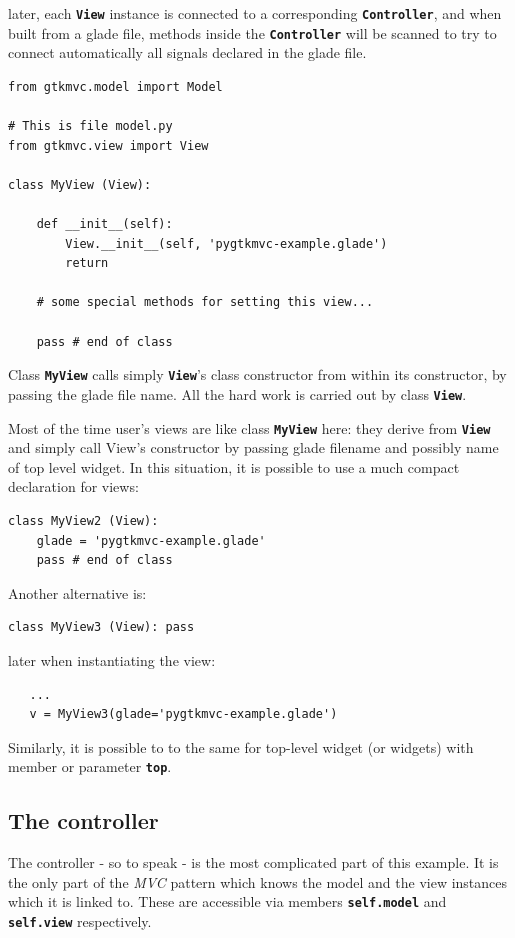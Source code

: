 \documentclass{article}
\newcommand{\kw}[1]{\emph{#1}\xspace}
\newcommand{\mvc}{\kw{MVC} pattern\xspace}
\newcommand{\codename}[1]{\texttt{\bfseries \textcolor {codecolor}{#1}}\xspace}
\newcommand{\codesize}{\small } %
\begin{document}
later, each \codename{View} instance is connected to a
corresponding \codename{Controller}, and when built from a glade file,
methods inside the \codename{Controller} will be scanned to try to
connect automatically all signals declared in the glade file.

{ \codesize 
\begin{verbatim}   
from gtkmvc.model import Model
  
# This is file model.py
from gtkmvc.view import View

class MyView (View):

    def __init__(self):
        View.__init__(self, 'pygtkmvc-example.glade')
        return

    # some special methods for setting this view...

    pass # end of class
\end{verbatim}
}

Class \codename{MyView} calls simply \codename{View}'s class
constructor from within its constructor, by passing the glade file
name. All the hard work is carried out by class \codename{View}.

Most of the time user's views are like class \codename{MyView}
here: they derive from \codename{View} and simply call View's
constructor by passing glade filename and possibly name of top
level widget. In this situation, it is possible to use a much
compact declaration for views:

{ \codesize 
\begin{verbatim}   
class MyView2 (View):
    glade = 'pygtkmvc-example.glade'
    pass # end of class
\end{verbatim}
}

Another alternative is:

{ \codesize 
\begin{verbatim}   
class MyView3 (View): pass
\end{verbatim}
}

later when instantiating the view:
{ \codesize 
\begin{verbatim}   
   ...
   v = MyView3(glade='pygtkmvc-example.glade')
\end{verbatim}
}

Similarly, it is possible to to the same for top-level widget (or
widgets) with member or parameter \codename{top}.


\subsection{The controller}
The controller - so to speak - is the most complicated part of this
example. It is the only part of the \mvc which knows the model and the
view instances which it is linked to. These are accessible via members
\codename{self.model} and \codename{self.view} respectively.
  
\end{document}
